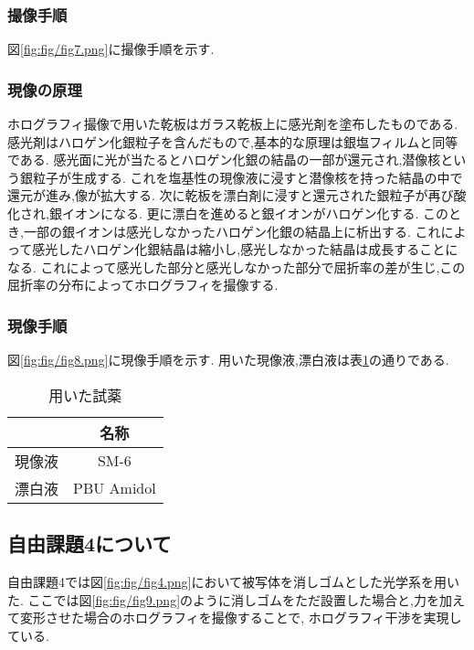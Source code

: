 \subsubsection{撮像手順}
図\ref{fig:fig/fig7.png}に撮像手順を示す.
\subsubsection{現像の原理}
ホログラフィ撮像で用いた乾板はガラス乾板上に感光剤を塗布したものである.
感光剤はハロゲン化銀粒子を含んだもので,基本的な原理は銀塩フィルムと同等である.
感光面に光が当たるとハロゲン化銀の結晶の一部が還元され,潜像核という銀粒子が生成する.
これを塩基性の現像液に浸すと潜像核を持った結晶の中で還元が進み,像が拡大する.
次に乾板を漂白剤に浸すと還元された銀粒子が再び酸化され,銀イオンになる.
更に漂白を進めると銀イオンがハロゲン化する.
このとき,一部の銀イオンは感光しなかったハロゲン化銀の結晶上に析出する.
これによって感光したハロゲン化銀結晶は縮小し,感光しなかった結晶は成長することになる.
これによって感光した部分と感光しなかった部分で屈折率の差が生じ,この屈折率の分布によってホログラフィを撮像する.
\subsubsection{現像手順}
図\ref{fig:fig/fig8.png}に現像手順を示す.
用いた現像液,漂白液は表\ref{tab:siyaku}の通りである.
\begin{table}[h]
\caption{用いた試薬}
\label{tab:siyaku}
\centering
\begin{tabular}{cc}
\hline
&名称\\
\hline \hline
現像液&SM-6\\
漂白液&PBU Amidol\\
\hline
\end{tabular}
\end{table}
\subsection{自由課題4について}
自由課題4では図\ref{fig:fig/fig4.png}において被写体を消しゴムとした光学系を用いた.
ここでは図\ref{fig:fig/fig9.png}のように消しゴムをただ設置した場合と,力を加えて変形させた場合のホログラフィを撮像することで,
ホログラフィ干渉を実現している.
